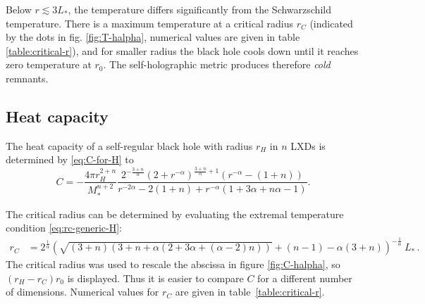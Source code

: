 \documentclass[12pt,a4paper]{report}
\numberwithin{equation}{chapter}
\begin{document}
Below $r \lesssim 3L_*$, the temperature differs significantly from the Schwarzschild temperature. There is a maximum temperature at a critical radius $r_C$ (indicated by the dots in fig. \ref{fig:T-halpha}, numerical values are given in table \ref{table:critical-r}), and for smaller radius the black hole cools down until it reaches zero temperature at $r_0$. The self-holographic metric produces therefore \emph{cold} remnants.


\subsection{Heat capacity}
The heat capacity of a self-regular black hole with radius $r_H$ in $n$ LXDs is determined by \ref{eq:C-for-H} to
\begin{equation}
C = - \frac{4\pi r_H^{2+n}}{M_*^{n+2}}
\frac{2^{-\frac{3+n}{\alpha}} \left(2+r^{-\alpha}\right)^{\frac{3+n}{\alpha}+1} \left(r^{-\alpha} - (1+n)\right)}
{r^{-2\alpha}  - 2(1+n) + r^{-\alpha} (1+3\alpha +n\alpha - 1) }.
\end{equation}

The critical radius can be determined by evaluating the extremal temperature condition \eqref{eq:rc-generic-H}:
%
\begin{align}\label{eq:rc-halpha}
r_{C} &= 
2^{\frac 1\alpha}
\left(
\sqrt{(3+n)(3+n+\alpha (2+3\alpha+(\alpha-2)n))}
+ (n-1) - \alpha(3+n)
\right)^{-\frac 1\alpha}
~L_* \,.
\end{align}
%
The critical radius was used to rescale the abscissa in figure \ref{fig:C-halpha}, so $(r_H-r_C)r_0$ is displayed. Thus it is easier to compare $C$ for a different number of dimensions. Numerical values for $r_C$ are given in table~\ref{table:critical-r}.
\end{document}

